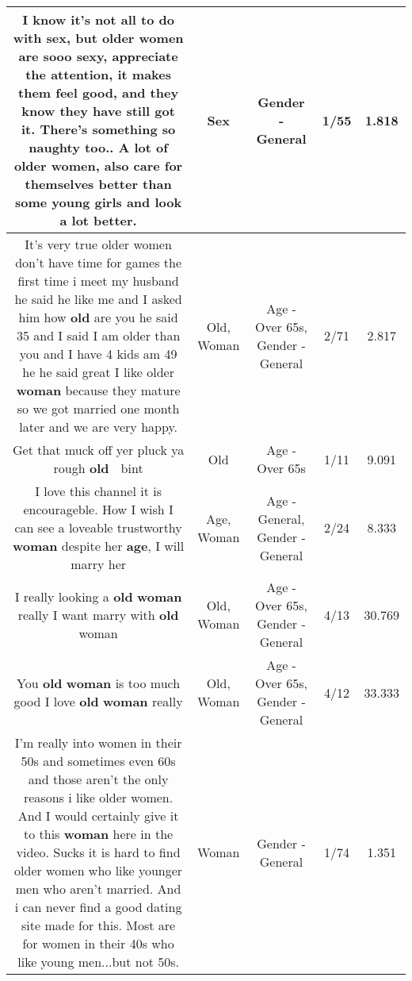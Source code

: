 \documentclass[11pt]{article}
\newlength\mylength
\begin{document}
\begin{center}
\begin{longtable}{|C{.65\mylength}|C{.30\mylength}|C{.12\mylength}|C{.12\mylength}|C{.12\mylength}|}
  \small I know it's not all to do  with \textbf{sex}, but older women are sooo sexy, appreciate the attention, it makes them feel good, and they know they have still got it. There's something so naughty too.. A lot of older women, also care for themselves better than some young girls and look a lot better.\normalsize   & Sex & Gender - General & 1/55 & 1.818 \\  \hline
  \small It's very true older women don't have time for games the first time i meet my husband he said he like me and I asked him how \textbf{old} are you he said 35 and I said I am older than you and I have 4 kids am 49 he he said great I like older \textbf{woman} because they mature so we got married one month later and we are very happy.\normalsize   & Old, Woman & Age - Over 65s, Gender - General & 2/71 & 2.817 \\  \hline
  \small Get that muck off yer pluck ya rough \textbf{old} 👵 bint\normalsize   & Old & Age - Over 65s & 1/11 & 9.091 \\  \hline
  \small I love this channel it is encourageble. How I wish I can  see a loveable trustworthy  \textbf{woman} despite her \textbf{age}, I will marry her\normalsize   & Age, Woman & Age - General, Gender - General & 2/24 & 8.333 \\  \hline
  \small I really looking a \textbf{old} \textbf{woman} really I want marry with \textbf{old} woman\normalsize   & Old, Woman & Age - Over 65s, Gender - General & 4/13 & 30.769 \\  \hline
  \small You \textbf{old} \textbf{woman} is too much good I love \textbf{old} \textbf{woman} really\normalsize   & Old, Woman & Age - Over 65s, Gender - General & 4/12 & 33.333 \\  \hline
  \small I'm really into women in their 50s and sometimes even 60s and those aren't the only reasons i like older women.  And I would certainly give it to this \textbf{woman} here in the video.  Sucks it is hard to find older women who like younger men who aren't married.  And i can never find a good dating site made for this.  Most are for women in their 40s who like young men...but not 50s.\normalsize   & Woman & Gender - General & 1/74 & 1.351 \\  \hline

\end{longtable}
\end{center}
\end{document}
